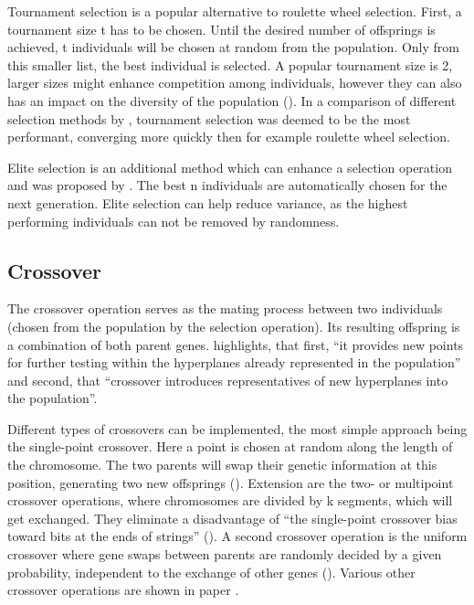 Tournament selection is a popular alternative to roulette wheel selection. First, a tournament size t has to be chosen. Until the desired number of offsprings is achieved, t individuals will be chosen at random from the population. Only from this smaller list, the best individual is selected. A popular tournament size is 2, larger sizes might enhance competition among individuals, however they can also has an impact on the diversity of the population (\cite{hussain_trade-off_2020}). In a comparison of different selection methods by \cite{jinghui_zhong_comparison_2005}, tournament selection was deemed to be the most performant, converging more quickly then for example roulette wheel selection.

Elite selection is an additional method which can enhance a selection operation and was proposed by \cite{de_jong_analysis_1975}. The best n individuals are automatically chosen for the next generation. Elite selection can help reduce variance, as the highest performing individuals can not be removed by randomness.

\subsection{Crossover}
The crossover operation serves as the mating process between two individuals (chosen from the population by the selection operation). Its resulting offspring is a combination of both parent genes. \cite{grefenstette_optimization_1986} highlights, that first, \enquote{it provides new points for further testing within the hyperplanes already represented in the population} and second, that \enquote{crossover introduces representatives of new hyperplanes into the population}. 

Different types of crossovers can be implemented, the most simple approach being the single-point crossover. Here a point is chosen at random along the length of the chromosome. The two parents will swap their genetic information at this position, generating two new offsprings (\cite{katoch_review_2021}). Extension are the two- or multipoint crossover operations, where chromosomes are divided by k segments, which will get exchanged. They eliminate a disadvantage of \enquote{the single-point crossover bias toward bits at the ends of strings} (\cite{srinivas_genetic_1994}). A second crossover operation is the uniform crossover where gene swaps between parents are randomly decided by a given probability, independent to the exchange of other genes (\cite{katoch_review_2021}). Various other crossover operations are shown in paper \cite{university_malaysia_of_computer_science_and_engineering_crossover_2017}.

